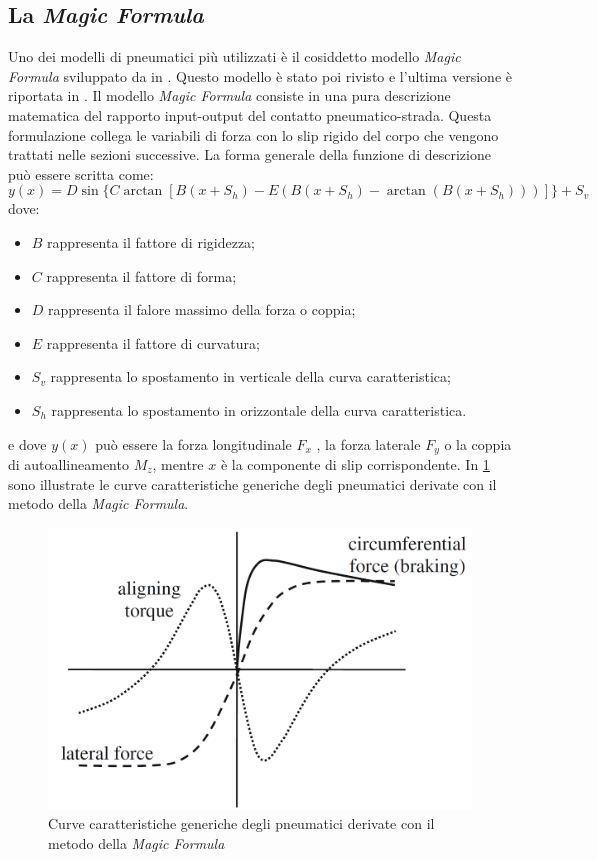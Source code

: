 \subsection{La \textit{Magic Formula}}
Uno dei modelli di pneumatici più utilizzati è il cosiddetto modello \textit{Magic Formula} sviluppato da \citeauthor{bakker} in \cite{bakker}. Questo modello è stato poi rivisto e l'ultima versione è riportata in \cite{hans}. Il modello \textit{Magic Formula} consiste in una pura descrizione matematica del rapporto input-output del contatto pneumatico-strada. Questa formulazione collega le variabili di forza con lo slip rigido del corpo che vengono trattati nelle sezioni successive. La forma generale della funzione di descrizione può essere scritta come:
%
\begin{equation}
y(x) = D\sin\{C\arctan[B(x + S_h ) - E(B(x + S_h ) - \arctan(B(x + S_h )))]\} + S_v
\end{equation}
%
dove:
\begin{itemize}
	\item $B$ rappresenta il fattore di rigidezza;
	\item $C$ rappresenta il fattore di forma;
	\item $D$ rappresenta il falore massimo della forza o coppia;
	\item $E$ rappresenta il fattore di curvatura;
	\item $S_v$ rappresenta lo spostamento in verticale della curva caratteristica;
	\item $S_h$ rappresenta lo spostamento in orizzontale della curva caratteristica.
\end{itemize}
e dove $y(x)$ può essere la forza longitudinale $F_x$ , la forza laterale $F_y$ o la coppia di autoallineamento $M_z$, mentre $x$ è la componente di slip corrispondente. In \figurename{ \ref{pacejka}} sono illustrate le curve caratteristiche generiche degli pneumatici derivate con il metodo della \textit{Magic Formula}.
%
\begin{figure}[h]
	\centering
	\includegraphics[width=0.58\linewidth]{Figures/pacejka}
	\caption{Curve caratteristiche generiche degli pneumatici derivate con il metodo della \textit{Magic Formula}}
	\label{pacejka}
\end{figure}

